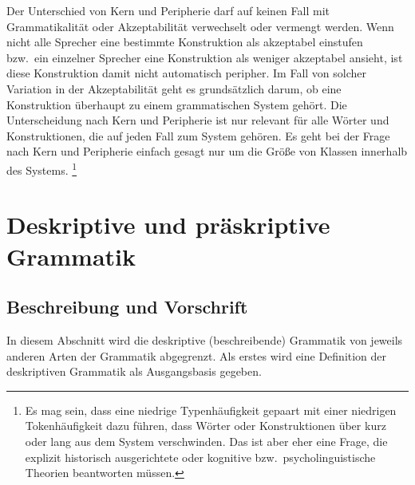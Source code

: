 
Der Unterschied von Kern und Peripherie darf auf keinen Fall mit Grammatikalität oder Akzeptabilität verwechselt oder vermengt werden.
Wenn nicht alle Sprecher eine bestimmte Konstruktion als akzeptabel einstufen bzw.\ ein einzelner Sprecher eine Konstruktion als weniger akzeptabel ansieht, ist diese Konstruktion damit nicht automatisch peripher.
Im Fall von solcher Variation in der Akzeptabilität geht es grundsätzlich darum, ob eine Konstruktion überhaupt zu einem grammatischen System gehört.
Die Unterscheidung nach Kern und Peripherie ist nur relevant für alle Wörter und Konstruktionen, die auf jeden Fall zum System gehören.
Es geht bei der Frage nach Kern und Peripherie einfach gesagt nur um die Größe von Klassen innerhalb des Systems.%
\footnote{Es mag sein, dass eine niedrige Typenhäufigkeit gepaart mit einer niedrigen Tokenhäufigkeit dazu führen, dass Wörter oder Konstruktionen über kurz oder lang aus dem System verschwinden.
Das ist aber eher eine Frage, die explizit historisch ausgerichtete oder kognitive bzw.\ psycholinguistische Theorien beantworten müssen.}

\section{Deskriptive und präskriptive Grammatik}

\label{sec:deskriptivenormativegrammatik}

\subsection{Beschreibung und Vorschrift}

In diesem Abschnitt wird die deskriptive (beschreibende) Grammatik von jeweils anderen Arten der Grammatik abgegrenzt.
Als erstes wird eine Definition der deskriptiven Grammatik als Ausgangsbasis gegeben.


